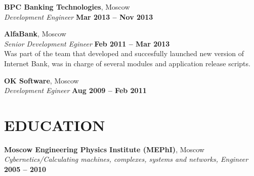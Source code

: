\documentclass[margin,line]{resume}
\begin{document}
\begin{resume}
    \textbf{\listing BPC Banking Technologies}, Moscow \vspace{2mm}\\\vspace{1mm}%
    \textsl{Development Engineer} \hfill \textbf{Mar 2013 – Nov 2013}

    \textbf{\listing AlfaBank}, Moscow \vspace{2mm}\\\vspace{1mm}%
    \textsl{Senior Development Egineer} \hfill \textbf{Feb 2011 – Mar 2013}\\
    Was part of the team that developed and succesfully launched new version of Internet Bank, was in charge of several modules and application release scripts.

    \textbf{\listing OK Software}, Moscow \vspace{2mm}\\\vspace{1mm}%
    \textsl{Development Egineer} \hfill \textbf{Aug 2009 -- Feb 2011}
    

\sectionline

    \section{\mysidestyle \textbf{\large{E}\small{DUCATION}}}

    \textbf{\listing Moscow Engineering Physics Institute (MEPhI)}, Moscow \vspace{2mm}\\\vspace{1mm}%
    \textsl{Cybernetics/Calculating machines, complexes, systems and networks, Engineer} \hfill \textbf{2005 -- 2010}\vspace{-3mm}\\\vspace{-1mm}%
    \vspace{-1.5mm}


\sectionline


\end{resume}
\end{document}

